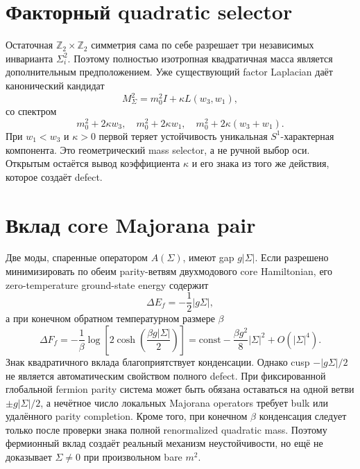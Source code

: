 \section{Факторный quadratic selector}

Остаточная \(\mathbb Z_2\times\mathbb Z_2\) симметрия сама по себе разрешает
три независимых инварианта \(\Sigma_i^2\). Поэтому полностью изотропная
квадратичная масса является дополнительным предположением. Уже существующий
factor Laplacian даёт канонический кандидат
\begin{equation}
 M_\Sigma^2=m_0^2I+\kappa L(w_3,w_1),
\end{equation}
со спектром
\begin{equation}
 m_0^2+2\kappa w_3,
 \quad
 m_0^2+2\kappa w_1,
 \quad
 m_0^2+2\kappa(w_3+w_1).
\end{equation}
При \(w_1<w_3\) и \(\kappa>0\) первой теряет устойчивость уникальная
\(S^1\)-характерная компонента. Это геометрический mass selector, а не
ручной выбор оси. Открытым остаётся вывод коэффициента \(\kappa\) и его знака
из того же действия, которое создаёт defect.

\section{Вклад core Majorana pair}

Две моды, спаренные оператором \(A(\Sigma)\), имеют gap
\(g|\Sigma|\). Если разрешено минимизировать по обеим parity-ветвям
двухмодового core Hamiltonian, его zero-temperature ground-state energy
содержит
\begin{equation}
 \Delta E_f=-\frac12|g\Sigma|,
\end{equation}
а при конечном обратном температурном размере \(\beta\)
\begin{equation}
 \Delta F_f
 =-\frac1\beta\log\left[2\cosh
 \left(\frac{\beta g|\Sigma|}{2}\right)\right]
 =\mathrm{const}-\frac{\beta g^2}{8}|\Sigma|^2+O(|\Sigma|^4).
\end{equation}
Знак квадратичного вклада благоприятствует конденсации. Однако cusp
\(-|g\Sigma|/2\) не является автоматическим свойством полного defect.
При фиксированной глобальной fermion parity система может быть обязана
оставаться на одной ветви \(\pm g|\Sigma|/2\), а нечётное число локальных
Majorana operators требует bulk или удалённого parity completion. Кроме того,
при конечном \(\beta\) конденсация следует только после проверки знака полной
renormalized quadratic mass. Поэтому фермионный вклад создаёт реальный
механизм неустойчивости, но ещё не доказывает \(\Sigma\ne0\) при произвольном
bare \(m^2\).

